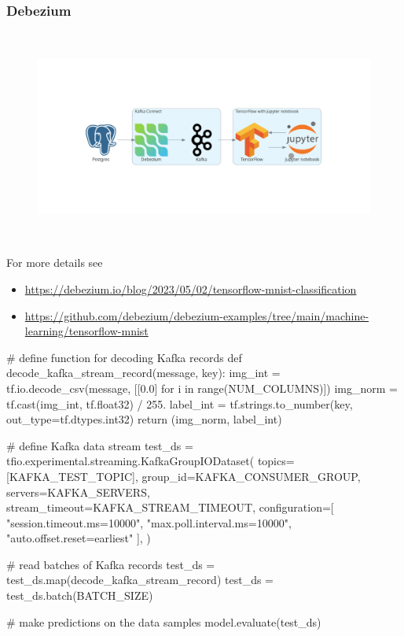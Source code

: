 \documentclass[10pt,utf8]{beamer}
\begin{document}
\begin{frame}
    \frametitle{Debezium}
    \vspace*{-3cm}
    \begin{figure}
        \hspace*{-1.4cm}
        \includegraphics[height=7cm]{./img/postgres_to_tf.eps}
    \end{figure}
    
    For more details see
    \begin{itemize}
        \item  \footnotesize \color{blue}\url{https://debezium.io/blog/2023/05/02/tensorflow-mnist-classification}\color{black}
        \item  \footnotesize \color{blue}\url{https://github.com/debezium/debezium-examples/tree/main/machine-learning/tensorflow-mnist}\color{black}
    \end{itemize}
\end{frame}

\begin{frame}[fragile]
    \footnotesize
    \begin{python}
# define function for decoding Kafka records
def decode_kafka_stream_record(message, key):
    img_int = tf.io.decode_csv(message, [[0.0] for i in range(NUM_COLUMNS)])
    img_norm = tf.cast(img_int, tf.float32) / 255.
    label_int = tf.strings.to_number(key, out_type=tf.dtypes.int32)
    return (img_norm, label_int)

# define Kafka data stream
test_ds = tfio.experimental.streaming.KafkaGroupIODataset(
    topics=[KAFKA_TEST_TOPIC],
    group_id=KAFKA_CONSUMER_GROUP,
    servers=KAFKA_SERVERS,
    stream_timeout=KAFKA_STREAM_TIMEOUT,
    configuration=[
        "session.timeout.ms=10000",
        "max.poll.interval.ms=10000",
        "auto.offset.reset=earliest"
    ],
)

# read batches of Kafka records
test_ds = test_ds.map(decode_kafka_stream_record)
test_ds = test_ds.batch(BATCH_SIZE)

# make predictions on the data samples
model.evaluate(test_ds)
    \end{python}
\end{frame}
\end{document}
